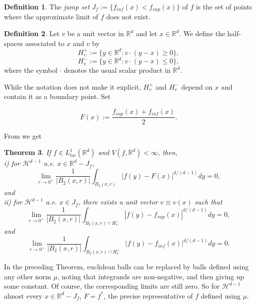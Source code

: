 \documentclass[12pt]{amsart}
\numberwithin{equation}{section}
\theoremstyle{plain}
\newtheorem{theorem}{Theorem}
\theoremstyle{definition}
\newtheorem{definition}[theorem]{Definition}
\theoremstyle{remark}
\begin{document}
\begin{definition}\label{jumpset}
The {\em jump set} $J_f:=\{f_{inf}(x)<f_{sup}(x)\}$ of $f$ is the set of points where the
approximate limit of $f$ does not exist.
\end{definition}

\begin{definition}
  Let $v$ be a unit vector in $\mathbb{R}^d$ and let $x\in\mathbb{R}^d$. We
  define the half-spaces associated to $x$ and $v$ by
  \begin{equation*}
    H_v^+:=\{y\in\mathbb{R}^d:v\cdot(y-x)\ge 0\},
  \end{equation*}
    \begin{equation*}
    H_v^-:=\{y\in\mathbb{R}^d:v\cdot(y-x)\le 0\},
  \end{equation*}
where the symbol $\cdot$ denotes the usual scalar product in $\mathbb{R}^d$.
\end{definition}

While the notation does not make it explicit, $H_v^+$ and $H_v^-$ depend
on $x$ and contain it as a boundary point. Set

$$F(x) := \frac{f_{sup}(x)+f_{inf}(x)}{2}.$$

From \cite[p.213, Theorem 3]{EvGa} we get
\begin{theorem}\label{densidadvspromedio}
If $f\in L_{loc}^1(\mathbb{R}^d)$ and
  $V(f,\mathbb{R}^d)<\infty$, then,
  \\
    i) for $\mathcal{H}^{d-1}$ a.e. $x\in \mathbb{R}^d-J_f$,
  \begin{equation*}
  \lim_{r\to 0^+}\frac{1}{|B_2(x,r)|}\int_{B_2(x,r)}|f(y)-F(x)|^{d/(d-1)}dy=0,
 \end{equation*}
  and\\
  ii) for $\mathcal{H}^{d-1}$ a.e. $x\in J_f$, there exists a unit
  vector $v\equiv v(x)$ such that
  \begin{equation*}
    \lim_{r\to 0^+} \frac{1}{|B_2(x,r)|}\int_{B_2(x,r)\cap
    H_v^-}|f(y)-f_{sup}(x)|^{d/(d-1)}dy=0,
  \end{equation*}
  and
\begin{equation*}
    \lim_{r\to 0^+} \frac{1}{|B_2(x,r)|}\int_{B_2(x,r)\cap
    H_v^+}|f(y)-f_{inf}(x)|^{d/(d-1)}dy=0.
  \end{equation*}
\end{theorem}

In the preceding Theorem, euclidean balls
can be replaced by balls defined using any other norm $\mu$,
noting that integrands are non-negative, and then
giving up some constant. Of course, the corresponding limits are
still zero.
So for $\mathcal{H}^{d-1}$ almost every
$x\in \mathbb{R}^d-J_f$, $F= f^*$, the precise representative of $f$
defined using $\mu$.
\end{document}
